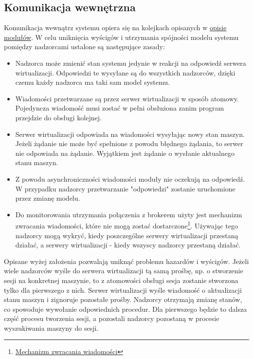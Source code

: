 \documentclass[../opis-rozwiazania.tex]{subfiles}
\begin{document}
\label{communication}

\subsection{Komunikacja wewnętrzna}
\label{communication:broker}

Komunikacja wewnątrz systemu opiera się na kolejkach opisanych w \hyperref[modules:broker]{opisie modułów}. W celu uniknięcia wyścigów i utrzymania spójności modelu systemu pomiędzy nadzorcami ustalone są następujące zasady:
\begin{itemize}
    \item Nadzorca może zmienić stan systemu jedynie w reakcji na odpowiedź serwera wirtualizacji. Odpowiedzi te wysyłane są do wszystkich nadzorców, dzięki czemu każdy nadzorca ma taki sam model systemu.
    \item Wiadomości przetwarzane są przez serwer wirtualizacji w sposób atomowy. Pojedyncza wiadomość musi zostać w pełni obsłużona zanim program przejdzie do obsługi kolejnej.
    \item Serwer wirtualizacji odpowiada na wiadomości wysyłając nowy stan maszyn. Jeżeli żądanie nie może być spełnione z powodu błędnego żądania, to serwer nie odpowiada na żądanie. Wyjątkiem jest żądanie o wysłanie aktualnego stanu maszyn.
    \item Z powodu asynchroniczności wiadomości moduły nie oczekują na odpowiedź. W przypadku nadzorcy przetwarzanie "odpowiedzi" zostanie uruchomione przez zmianę modelu.
    \item Do monitorowania utrzymania połączenia z brokerem użyty jest mechanizm zwracania wiadomości, które nie mogą zostać dostarczone\footnote{\href{https://www.rabbitmq.com/publishers.html\#unroutable/}{Mechanizm zwracania wiadomości}}. Używając tego nadzorcy mogą wykryć, kiedy poszczególne serwery wirtualizacji przestaną działać, a serwery wirtualizacji - kiedy wszyscy nadzorcy przestaną działać.
\end{itemize}

Opisane wyżej założenia pozwalają uniknąć problemu hazardów i wyścigów. Jeżeli wiele nadzorców wyśle do serwera wirtualizacji tą samą prośbę, np. o stworzenie sesji na konkretnej maszynie, to z atomowości obsługi sesja zostanie stworzona tylko dla pierwszego z nich. Serwer wirtualizacji wyśle wiadomość o aktualizacji stanu maszyn i zignoruje pozostałe prośby. Nadzorcy otrzymają zmianę stanów, co spowoduje wywołanie odpowiednich procedur. Dla pierwszego będzie to dalsza część procesu tworzenia sesji, a pozostali nadzorcy pozostaną w procesie wyszukiwania maszyny do sesji.
\end{document}
